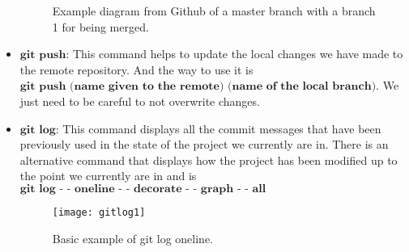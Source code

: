 \documentclass{book}
\begin{document}
\begin{itemize}
\begin{figure}[H]
\begin{center}
\caption{ Example diagram from Github of a master branch with a branch 1 for being merged.}
\label{fig:imggitpull}
\end{center}
\end{figure}

	\item $\textbf{git push:}$ This command helps to update the local changes we have made to the remote repository. And the way to use it is $\textbf{git push (name given to the remote) (name of the local branch)}$. We just need to be careful to not overwrite changes. 
	\item $\textbf{git log:}$  This command displays all the commit messages that have been previously used in the state of the project we currently are in. There is an alternative command that displays how the project has been modified up to the point we currently are in and is $\textbf{git log - - oneline  - - decorate - - graph - - all}$

\begin{figure}[H]
\begin{center}
	\texttt{[image: gitlog1]}

\caption{Basic example of git log oneline.}
\label{fig:imggitlog}
\end{center}
\end{figure}

\end{itemize}

\newpage
\end{document}
